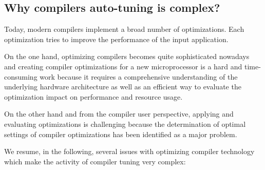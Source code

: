  
 
 

\subsection{Why compilers auto-tuning is complex?}

Today, modern compilers implement a broad number of optimizations. Each optimization tries to improve the performance of the input application.

On the one hand, optimizing compilers becomes quite sophisticated nowadays and creating compiler optimizations for a new microprocessor is a hard and time-consuming work because it requires a comprehensive understanding of the underlying hardware architecture as well as an efficient way to evaluate the optimization impact on performance and resource usage. 

On the other hand and from the compiler user perspective, applying and evaluating optimizations is challenging because the determination of optimal settings of compiler optimizations has been identified as a major problem\cite{knijnenburg2002iterative}.

We resume, in the following, several issues with optimizing compiler technology which make the activity of compiler tuning very complex:

